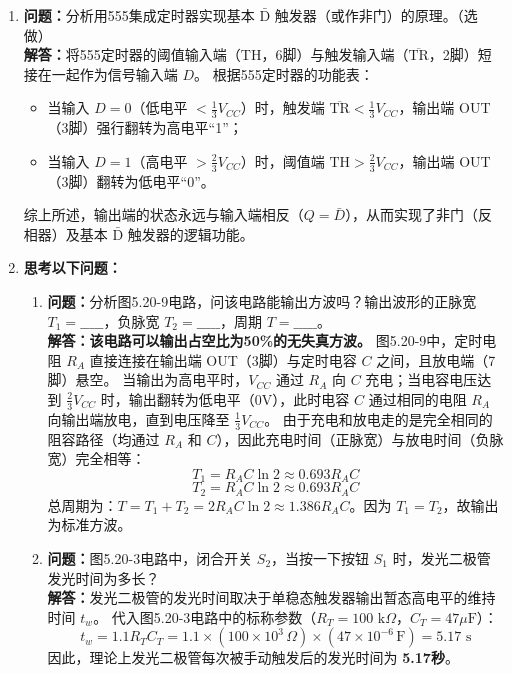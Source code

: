 \documentclass[10.5pt]{config}
\begin{document}
\begin{enumerate}[label=\arabic*., leftmargin=2em]
    \item[2.] \textbf{问题：}分析用555集成定时器实现基本 $\bar{\text{D}}$ 触发器（或作非门）的原理。（选做）
    \\ \textbf{解答：}将555定时器的阈值输入端（TH，6脚）与触发输入端（$\overline{\text{TR}}$，2脚）短接在一起作为信号输入端 $D$。
    根据555定时器的功能表：
    \begin{itemize}
        \item 当输入 $D = 0$（低电平 $< \frac{1}{3}V_{CC}$）时，触发端 $\overline{\text{TR}} < \frac{1}{3}V_{CC}$，输出端 OUT（3脚）强行翻转为高电平“1”；
        \item 当输入 $D = 1$（高电平 $> \frac{2}{3}V_{CC}$）时，阈值端 $\text{TH} > \frac{2}{3}V_{CC}$，输出端 OUT（3脚）翻转为低电平“0”。
    \end{itemize}
    综上所述，输出端的状态永远与输入端相反（$Q = \bar{D}$），从而实现了非门（反相器）及基本 $\bar{\text{D}}$ 触发器的逻辑功能。

    \item[3.] \textbf{思考以下问题：}
    \begin{enumerate}[label=(\arabic*)]
        \item \textbf{问题：}分析图5.20-9电路，问该电路能输出方波吗？输出波形的正脉宽 $T_1 = \_\_\_\_\_$，负脉宽 $T_2 = \_\_\_\_\_$，周期 $T = \_\_\_\_\_$。
        \\ \textbf{解答：}\textbf{该电路可以输出占空比为50\%的无失真方波。}
        图5.20-9中，定时电阻 $R_A$ 直接连接在输出端 OUT（3脚）与定时电容 $C$ 之间，且放电端（7脚）悬空。
        当输出为高电平时，$V_{CC}$ 通过 $R_A$ 向 $C$ 充电；当电容电压达到 $\frac{2}{3}V_{CC}$ 时，输出翻转为低电平（0V），此时电容 $C$ 通过相同的电阻 $R_A$ 向输出端放电，直到电压降至 $\frac{1}{3}V_{CC}$。
        由于充电和放电走的是完全相同的阻容路径（均通过 $R_A$ 和 $C$），因此充电时间（正脉宽）与放电时间（负脉宽）完全相等：
        $$T_1 = R_A C \ln 2 \approx 0.693 R_A C$$
        $$T_2 = R_A C \ln 2 \approx 0.693 R_A C$$
        总周期为：$T = T_1 + T_2 = 2 R_A C \ln 2 \approx 1.386 R_A C$。因为 $T_1 = T_2$，故输出为标准方波。

        \item \textbf{问题：}图5.20-3电路中，闭合开关 $S_2$，当按一下按钮 $S_1$ 时，发光二极管发光时间为多长？
        \\ \textbf{解答：}发光二极管的发光时间取决于单稳态触发器输出暂态高电平的维持时间 $t_w$。
        代入图5.20-3电路中的标称参数（$R_T = 100\text{ k}\Omega$，$C_T = 47\mu\text{F}$）：
        $$t_w = 1.1 R_T C_T = 1.1 \times (100 \times 10^3\,\Omega) \times (47 \times 10^{-6}\,\text{F}) = 5.17\text{ s}$$
        因此，理论上发光二极管每次被手动触发后的发光时间为 \textbf{5.17秒}。


\end{enumerate}
\end{enumerate}
\end{document}
